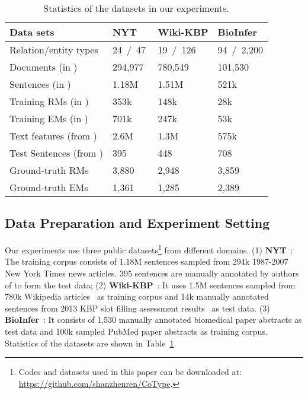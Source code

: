 \documentclass[letterpaper]{sig-alternate-2013}
\begin{document}
\begin{table}[t]
\vspace{-0.3cm}
\begin{scriptsize}
\begin{center}
\begin{tabularx}{0.87\linewidth}{l lll}
\hline
\textbf{Data sets~~~} & \textbf{NYT} & \textbf{Wiki-KBP} & \textbf{BioInfer} \\
\hline
Relation/entity types & 24~/~47  & 19~/~126 & 94~/~2,200 \\ Documents (in ) & 294,977~ & 780,549 & 101,530 \\ Sentences (in ) & 1.18M & 1.51M & 521k \\ Training RMs (in ) & 353k & 148k & 28k \\ Training EMs (in ) & 701k & 247k  & 53k \\ Text features (from ) & 2.6M & 1.3M & 575k \\ Test Sentences (from ) & 395 & 448 & 708 \\ Ground-truth RMs & 3,880 & 2,948 & 3,859 \\ Ground-truth EMs & 1,361 & 1,285 & 2,389 \\ \hline
\end{tabularx}
\caption{Statistics of the datasets in our experiments.}
\label{table:data_stats}
\vspace{-0.4cm}
\end{center}
\end{scriptsize}
\end{table}


\subsection{Data Preparation and Experiment Setting}
\label{subsec:data_preparation}
Our experiments use three public datasets\footnote{\small  Codes and datasets used in this paper can be downloaded at: \url{https://github.com/shanzhenren/CoType}.} from different domains. (1) \textbf{NYT}~\cite{riedel2010modeling}: The training corpus consists of 1.18M sentences sampled from 294k 1987-2007 New York Times news articles. 395 sentences are manually annotated by authors of \cite{hoffmann2011multiR} to form the test data;
(2) \textbf{Wiki-KBP}~\cite{ling2012fine}: It uses 1.5M sentences sampled from 780k Wikipedia articles~\cite{ling2012fine} as training corpus and 14k manually annotated sentences from 2013 KBP slot filling assessment results~\cite{ellislinguistic} as test data.
(3) \textbf{BioInfer}~\cite{pyysalo2007bioinfer}: It consists of 1,530 manually annotated biomedical paper abstracts as test data and 100k sampled PubMed paper abstracts as training corpus.
Statistics of the datasets are shown in Table~\ref{table:data_stats}.
\end{document}
